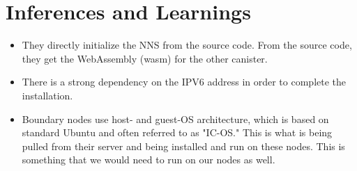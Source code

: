 \section{Inferences and Learnings}

\begin{itemize}
\item They directly initialize the NNS from the source code. From the source code, they get the WebAssembly (wasm) for the other 
canister.
\item There is a strong dependency on the IPV6 address in order to complete the installation.
\item Boundary nodes use host- and guest-OS architecture, which is based on standard Ubuntu and often referred to as "IC-OS." 
This is what is being pulled from their server and being installed and run on these nodes. This is something that we would need 
to run on our nodes as well.
\end{itemize}
